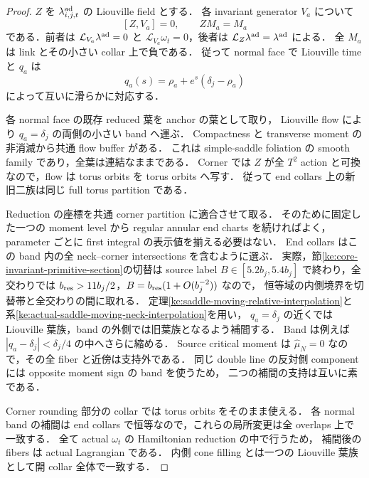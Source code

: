 \begin{proof}
$Z$ を $\lambda^{\rm ad}_{i,j,t}$ の Liouville field とする．
各 invariant generator $V_a$ について
\[
 [Z,V_a]=0,\qquad ZM_a=M_a
\]
である．前者は $\mathcal L_{V_a}\lambda^{\rm ad}=0$ と
$\mathcal L_{V_a}\omega_t=0$，後者は $\mathcal L_Z\lambda^{\rm ad}=\lambda^{\rm ad}$ による．
全 $M_a$ は link とその小さい collar 上で負である．
従って normal face で Liouville time と $q_a$ は
\[
 q_a(s)=\rho_a+e^s(\delta_j-\rho_a)
\]
によって互いに滑らかに対応する．

各 normal face の既存 reduced 葉を anchor の葉として取り，
Liouville flow により $q_a=\delta_j$ の両側の小さい band へ運ぶ．
Compactness と transverse moment の非消滅から共通 flow buffer がある．
これは simple-saddle foliation の smooth family であり，全葉は連結なままである．
Corner では $Z$ が全 $T^2$ action と可換なので，flow は torus orbits を torus orbits へ写す．
従って end collars 上の新旧二族は同じ full torus partition である．

Reduction の座標を共通 corner partition に適合させて取る．
そのために固定した一つの moment level から regular annular end charts を続ければよく，
parameter ごとに first integral の表示値を揃える必要はない．
End collars はこの band 内の全 neck--corner intersections を含むように選ぶ．
実際，節\ref{ke:core-invariant-primitive-section}の切替は source label
$B\in[5.2b_j,5.4b_j]$ で終わり，全交わりでは
$b_{\rm res}>11b_j/2$，$B=b_{\rm res}(1+O(b_j^{-2}))$ なので，
恒等域の内側境界を切替帯と全交わりの間に取れる．
定理\ref{ke:saddle-moving-relative-interpolation}と
系\ref{ke:actual-saddle-moving-neck-interpolation}を用い，
$q_a=\delta_j$ の近くでは Liouville 葉族，band の外側では旧葉族となるよう補間する．
Band は例えば $|q_a-\delta_j|<\delta_j/4$ の中へさらに縮める．
Source critical moment は $\widehat\mu_N=0$ なので，その全 fiber と近傍は支持外である．
同じ double line の反対側 component には opposite moment sign の band を使うため，
二つの補間の支持は互いに素である．

Corner rounding 部分の collar では torus orbits をそのまま使える．
各 normal band の補間は end collars で恒等なので，これらの局所変更は全 overlaps 上で一致する．
全て actual $\omega_t$ の Hamiltonian reduction の中で行うため，
補間後の fibers は actual Lagrangian である．
内側 cone filling とは一つの Liouville 葉族として開 collar 全体で一致する．
\end{proof}

